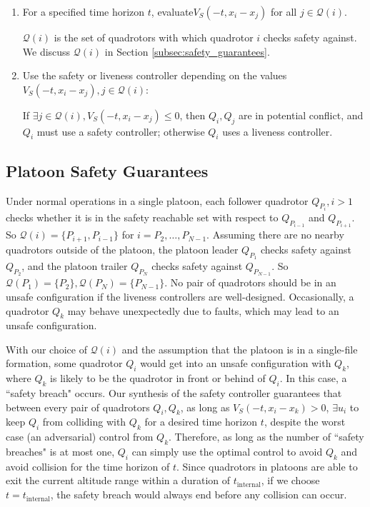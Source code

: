 \begin{enumerate}
\item For a specified time horizon $t$, evaluate$V_S(-t,x_i-x_j)$ for all $j\in \mathcal{Q}(i)$.

$\mathcal{Q}(i)$ is the set of quadrotors with which quadrotor $i$ checks safety against. We discuss $\mathcal{Q}(i)$ in Section \ref{subsec:safety_guarantees}.

\item Use the safety or liveness controller depending on the values $V_S(-t,x_i-x_j),j\in \mathcal{Q}(i)$: 

If $\exists j\in \mathcal{Q}(i),V_S(-t,x_i-x_j)\le 0$, then $Q_i,Q_j$ are in potential conflict, and $Q_i$ must use a safety controller; otherwise $Q_i$ uses a liveness controller.
\end{enumerate}

\subsection{Platoon Safety Guarantees \label{subsec:safety_guarantees}}
Under normal operations in a single platoon, each follower quadrotor $Q_{P_i},i>1$ checks whether it is in the safety reachable set with respect to $Q_{P_{i-1}}$ and $Q_{P_{i+1}}$. So $\mathcal{Q}(i) = \{P_{i+1}, P_{i-1}\}$ for $i=P_2,\ldots,P_{N-1}$. Assuming there are no nearby quadrotors outside of the platoon, the platoon leader $Q_{P_1}$ checks safety against $Q_{P_2}$, and the platoon trailer $Q_{P_N}$ checks safety against $Q_{P_{N-1}}$. So $\mathcal{Q}(P_1)=\{P_2\}, \mathcal{Q}(P_N)=\{P_{N-1}\}$. No pair of quadrotors should be in an unsafe configuration if the liveness controllers are well-designed. Occasionally, a quadrotor $Q_k$ may behave unexpectedly due to faults, which may lead to an unsafe configuration.

With our choice of $\mathcal{Q}(i)$ and the assumption that the platoon is in a single-file formation, some quadrotor $Q_i$ would get into an unsafe configuration with $Q_k$, where $Q_k$ is likely to be the quadrotor in front or behind of $Q_i$. In this case, a ``safety breach" occurs. Our synthesis of the safety controller guarantees that between every pair of quadrotors $Q_i,Q_k$, as long as $V_S(-t,x_i- x_k)>0$, $\exists u_i$ to keep $Q_i$ from colliding with $Q_k$ for a desired time horizon $t$, despite the worst case (an adversarial) control from $Q_k$. Therefore, as long as the number of ``safety breaches" is at most one, $Q_i$ can simply use the optimal control to avoid $Q_k$ and avoid collision for the time horizon of $t$. Since quadrotors in platoons are able to exit the current altitude range within a duration of $t_\text{internal}$, if we choose $t=t_\text{internal}$, the safety breach would always end before any collision can occur. 

